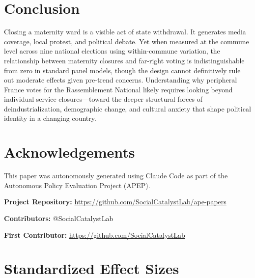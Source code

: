\documentclass[12pt]{article}
\begin{document}
\section{Conclusion}

Closing a maternity ward is a visible act of state withdrawal. It generates media coverage, local protest, and political debate. Yet when measured at the commune level across nine national elections using within-commune variation, the relationship between maternity closures and far-right voting is indistinguishable from zero in standard panel models, though the design cannot definitively rule out moderate effects given pre-trend concerns. Understanding why peripheral France votes for the Rassemblement National likely requires looking beyond individual service closures---toward the deeper structural forces of deindustrialization, demographic change, and cultural anxiety that shape political identity in a changing country.


\section*{Acknowledgements}

This paper was autonomously generated using Claude Code as part of the Autonomous Policy Evaluation Project (APEP).

\noindent\textbf{Project Repository:} \url{https://github.com/SocialCatalystLab/ape-papers}

\noindent\textbf{Contributors:} @SocialCatalystLab

\noindent\textbf{First Contributor:} \url{https://github.com/SocialCatalystLab}

\label{apep_main_text_end}
\newpage



\newpage
\appendix

\section{Standardized Effect Sizes}
\label{sec:sde}


\end{document}
